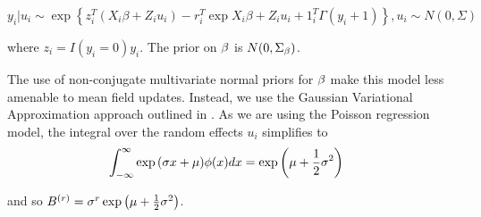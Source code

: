 \documentclass{amsart}
\begin{document}
$$
y_i|u_i \sim \exp{\left\{z_i^T(X_i \beta+ Z_i u_i) - r_i^T \exp{X_i\beta + Z_i u_i} + 1_i^T\Gamma(y_i + 1)\right\}}, u_i \sim N(0, \Sigma)
$$

where $z_i = I(y_i = 0)y_i$. The prior on $\bf \beta$ is $N(0, \Sigma_{\bf \beta})$.

The use of non-conjugate multivariate normal priors for $\bf \beta$ make this model less
amenable to mean field updates. Instead, we use the Gaussian Variational Approximation
approach outlined in \cite{ormerod09}. As we are using the Poisson regression model, the
integral over the random effects $u_i$ simplifies to
\begin{align*}
\int_{-\infty}^\infty \exp{\left( \sigma x + \mu \right)} \phi(x) dx &= \exp{\left( \mu + \frac{1}{2}\sigma^2\right)}
\end{align*}

and so $B^{(r)} = \sigma^r \exp{\left( \mu + \frac{1}{2}\sigma^2\right)}$.





\end{document}
